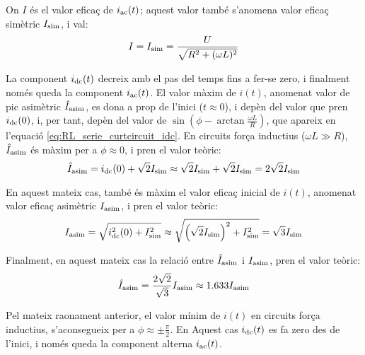On $I$ és el valor eficaç de $i_\mathrm{ac}(t)$; aquest valor també s'anomena valor eficaç simètric $I_\mathrm{sim}$, i val:
\begin{equation}
    I = I_\mathrm{sim} =\frac{U}{\sqrt{R^2+(\omega L)^2}}
    \label{eq:RL_serie_curtcircuit_I}
\end{equation}

La component $i_\mathrm{dc}(t)$ decreix amb el pas del temps fins a fer-se zero, i finalment només queda la component $i_\mathrm{ac}(t)$. El valor màxim de $i(t)$, anomenat valor de pic asimètric $\hat{I}_\mathrm{asim}$, es dona a prop de l'inici ($t\approx 0$), i depèn del valor que pren $i_\mathrm{dc}(0)$, i, per tant, depèn del valor de $\sin\left(\phi - \arctan\frac{\omega L}{R}\right)$, que apareix en l'equació \eqref{eq:RL_serie_curtcircuit_idc}. En circuits força inductius ($\omega L\gg R$), $\hat{I}_\mathrm{asim}$ és màxim per a $\phi \approx 0$, i pren el valor teòric:
\begin{equation}
    \hat{I}_\mathrm{asim} = i_\mathrm{dc}(0) + \sqrt{2} I_\mathrm{sim} \approx \sqrt{2} I_\mathrm{sim} +\sqrt{2} I_\mathrm{sim} =2 \sqrt{2} I_\mathrm{sim}    \label{eq:I_asim_pic}
\end{equation}


En aquest mateix cas, també és màxim el valor eficaç inicial de $i(t)$, anomenat valor eficaç asimètric $I_\mathrm{asim}$,  i pren el valor teòric:
\begin{equation}
    I_\mathrm{asim} = \sqrt{i_\mathrm{dc}^2(0) + I_\mathrm{sim}^2} \approx \sqrt{\left(\sqrt{2}I_\mathrm{sim}\right)^2 + I_\mathrm{sim}^2} = \sqrt{3} I_\mathrm{sim} \label{eq:I_asim_eff}
\end{equation}

Finalment, en aquest mateix cas la relació entre $\hat{I}_\mathrm{asim}$ i $I_\mathrm{asim}$,   pren el valor teòric:
\begin{equation}
    \hat{I}_\mathrm{asim} = \frac{2\sqrt{2}}{\sqrt{3}} I_\mathrm{asim} \approx
    \num{1,633} I_\mathrm{asim}
\end{equation}

Pel mateix raonament anterior, el valor mínim de $i(t)$ en circuits força inductius, s'aconsegueix per a $\phi \approx \pm\frac{\pi}{2}$. En Aquest cas $i_\mathrm{dc}(t)$ es fa zero des de l'inici, i només queda la component alterna $i_\mathrm{ac}(t)$.


